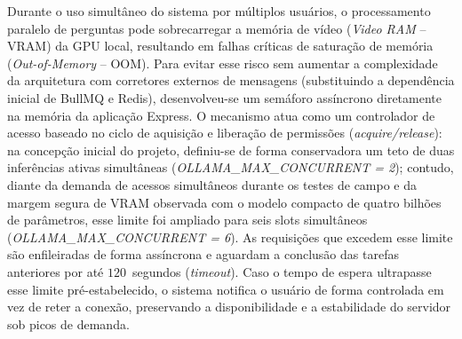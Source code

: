 \documentclass[12pt]{article}
\begin{document}
Durante o uso simultâneo do sistema por múltiplos usuários, o processamento paralelo de perguntas pode sobrecarregar a memória de vídeo (\textit{Video RAM} -- VRAM) da GPU local, resultando em falhas críticas de saturação de memória (\textit{Out-of-Memory} -- OOM). Para evitar esse risco sem aumentar a complexidade da arquitetura com corretores externos de mensagens (substituindo a dependência inicial de BullMQ e Redis), desenvolveu-se um semáforo assíncrono diretamente na memória da aplicação Express. O mecanismo atua como um controlador de acesso baseado no ciclo de aquisição e liberação de permissões (\textit{acquire/release}): na concepção inicial do projeto, definiu-se de forma conservadora um teto de duas inferências ativas simultâneas (\textit{OLLAMA\_MAX\_CONCURRENT = 2}); contudo, diante da demanda de acessos simultâneos durante os testes de campo e da margem segura de VRAM observada com o modelo compacto de quatro bilhões de parâmetros, esse limite foi ampliado para seis slots simultâneos (\textit{OLLAMA\_MAX\_CONCURRENT = 6}). As requisições que excedem esse limite são enfileiradas de forma assíncrona e aguardam a conclusão das tarefas anteriores por até $120$~segundos (\textit{timeout}). Caso o tempo de espera ultrapasse esse limite pré-estabelecido, o sistema notifica o usuário de forma controlada em vez de reter a conexão, preservando a disponibilidade e a estabilidade do servidor sob picos de demanda.
\end{document}
